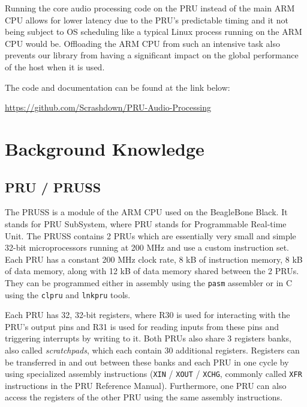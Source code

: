 \documentclass[]{report}
\begin{document}
Running the core audio processing code on the PRU instead of the main ARM CPU allows for lower latency due to the PRU's predictable timing and it not being subject to OS scheduling like a typical Linux process running on the ARM CPU would be. Offloading the ARM CPU from such an intensive task also prevents our library from having a significant impact on the global performance of the host when it is used.

The code and documentation can be found at the link below:
\begin{center}
	\url{https://github.com/Scrashdown/PRU-Audio-Processing}
\end{center}

	\chapter{Background Knowledge}
	\label{theory}

\hypertarget{pru-pruss}{%
\section{PRU / PRUSS}\label{pru-pruss}}

The PRUSS is a module of the ARM CPU used on the BeagleBone Black. It stands for PRU SubSystem, where PRU stands for Programmable Real-time Unit. The PRUSS contains 2 PRUs which are essentially very small and simple 32-bit microprocessors running at 200 MHz and use a custom instruction set. Each PRU has a constant 200 MHz clock rate, 8 kB of instruction memory, 8 kB of data memory, along with 12 kB of data memory shared between the 2 PRUs. They can be programmed either in assembly using the \texttt{pasm} assembler or in C using the \texttt{clpru} and \texttt{lnkpru} tools.

Each PRU has 32, 32-bit registers, where R30 is used for interacting with the PRU's output pins and R31 is used for reading inputs from these pins and triggering interrupts by writing to it. Both PRUs also share 3 registers banks, also called \emph{scratchpads}, which each contain 30 additional registers. Registers can be transferred in and out between these banks and each PRU in one cycle by using specialized assembly instructions (\texttt{XIN} / \texttt{XOUT} / \texttt{XCHG}, commonly called \texttt{XFR} instructions in the PRU Reference Manual). Furthermore, one PRU can also access the registers of the other PRU using the same assembly instructions.
\end{document}
